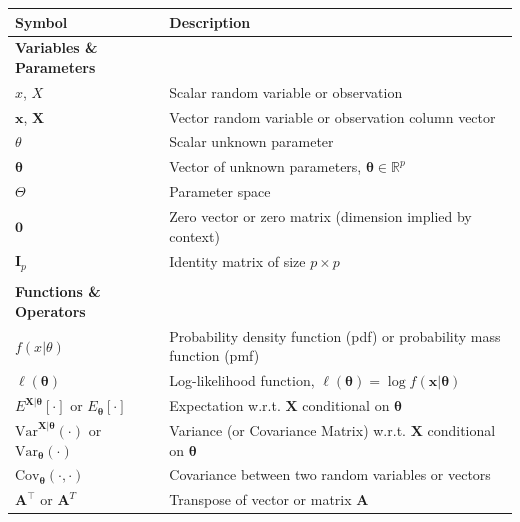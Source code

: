 \documentclass[
  letterpaper,
  DIV=11,
  numbers=noendperiod]{scrreprt}
\renewcommand{\[}{\begin{equation}}
\renewcommand{\]}{\end{equation}}
\theoremstyle{definition}
\theoremstyle{plain}
\theoremstyle{plain}
\theoremstyle{plain}
\theoremstyle{definition}
\theoremstyle{plain}
\theoremstyle{remark}
\begin{document}
\begin{longtable}[]{@{}
  >{\raggedright\arraybackslash}p{}
  >{\raggedright\arraybackslash}p{}@{}}
\toprule\noalign{}
\begin{minipage}[b]{\linewidth}\raggedright
Symbol
\end{minipage} & \begin{minipage}[b]{\linewidth}\raggedright
Description
\end{minipage} \\
\midrule\noalign{}
\endhead
\bottomrule\noalign{}
\endlastfoot
\textbf{Variables \& Parameters} & \\
\(x\), \(X\) & Scalar random variable or observation \\
\(\mathbf{x}\), \(\mathbf{X}\) & Vector random variable or observation
column vector \\
\(\theta\) & Scalar unknown parameter \\
\(\boldsymbol{\theta}\) & Vector of unknown parameters,
\(\boldsymbol{\theta} \in \mathbb{R}^p\) \\
\(\Theta\) & Parameter space \\
\(\mathbf{0}\) & Zero vector or zero matrix (dimension implied by
context) \\
\(\mathbf{I}_p\) & Identity matrix of size \(p \times p\) \\
& \\
\textbf{Functions \& Operators} & \\
\(f(x|\theta)\) & Probability density function (pdf) or probability mass
function (pmf) \\
\(\ell(\boldsymbol{\theta})\) & Log-likelihood function,
\(\ell(\boldsymbol{\theta}) = \log f(\mathbf{x}|\boldsymbol{\theta})\) \\
\(E^{\mathbf{X}|\boldsymbol{\theta}}[\cdot]\) or
\(E_{\boldsymbol{\theta}}[\cdot]\) & Expectation w.r.t. \(\mathbf{X}\)
conditional on \(\boldsymbol{\theta}\) \\
\(\text{Var}^{\mathbf{X}|\boldsymbol{\theta}}(\cdot)\) or
\(\text{Var}_{\boldsymbol{\theta}}(\cdot)\) & Variance (or Covariance
Matrix) w.r.t. \(\mathbf{X}\) conditional on \(\boldsymbol{\theta}\) \\
\(\text{Cov}_{\boldsymbol{\theta}}(\cdot, \cdot)\) & Covariance between
two random variables or vectors \\
\(\mathbf{A}^\top\) or \(\mathbf{A}^T\) & Transpose of vector or matrix
\(\mathbf{A}\) \\

\end{longtable}
\end{document}
